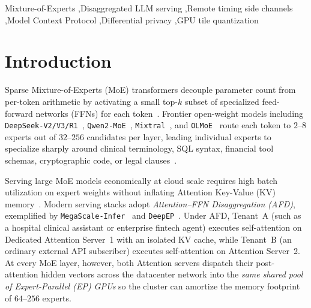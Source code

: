 \documentclass[final,5p,times,twocolumn]{elsarticle}
\theoremstyle{definition}
\theoremstyle{remark}
\begin{document}
\begin{frontmatter}
\begin{keyword}
Mixture-of-Experts \sep Disaggregated LLM serving \sep Remote timing side channels \sep Model Context Protocol \sep Differential privacy \sep GPU tile quantization
\end{keyword}

\end{frontmatter}

\section{Introduction}\label{sec:intro}

Sparse Mixture-of-Experts (MoE) transformers decouple parameter count from per-token arithmetic by activating a small top-$k$ subset of specialized feed-forward networks (FFNs) for each token~\cite{shazeer2017outrageously,fedus2022switch}. Frontier open-weight models including \texttt{DeepSeek-V2/V3/R1}~\cite{deepseek2024v2,deepseek2025v3,deepseek2025r1}, \texttt{Qwen2-MoE}~\cite{yang2024qwen2moe}, \texttt{Mixtral}~\cite{jiang2024mixtral}, and \texttt{OLMoE}~\cite{muennighoff2025olmoe} route each token to $2$--$8$ experts out of $32$--$256$ candidates per layer, leading individual experts to specialize sharply around clinical terminology, SQL syntax, financial tool schemas, cryptographic code, or legal clauses~\cite{dai2024deepseekmoe}.

Serving large MoE models economically at cloud scale requires high batch utilization on expert weights without inflating Attention Key-Value (KV) memory~\cite{kwon2023vllm,zheng2024sglang,zhong2024distserve,patel2024splitwise}. Modern serving stacks adopt \emph{Attention--FFN Disaggregation (AFD)}, exemplified by \texttt{MegaScale-Infer}~\cite{zhu2025megascaleinfer} and \texttt{DeepEP}~\cite{zhao2025deepep}. Under AFD, Tenant~A (such as a hospital clinical assistant or enterprise fintech agent) executes self-attention on Dedicated Attention Server~1 with an isolated KV cache, while Tenant~B (an ordinary external API subscriber) executes self-attention on Attention Server~2. At every MoE layer, however, both Attention servers dispatch their post-attention hidden vectors across the datacenter network into the \emph{same shared pool of Expert-Parallel (EP) GPUs} so the cluster can amortize the memory footprint of $64$--$256$ experts.
\end{document}
